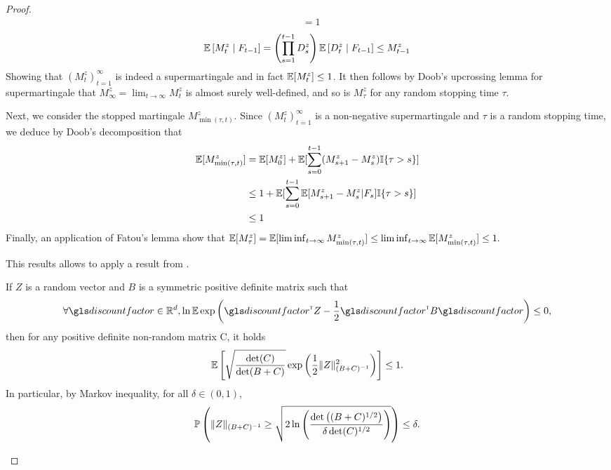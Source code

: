 \begin{subappendices}
\begin{proof}
\begin{align*}
		&= 1
		\end{align*}
		\begin{align*}
		\operatorname*{\mathbb{E}}\left[M_t^z \;\middle|\; F_{t-1}\right] = \left(\prod_{s=1}^{t-1} D_s^z\right) \operatorname*{\mathbb{E}}\left[D_t^z \;\middle|\; F_{t-1}\right] \leq M_{t-1}^z
		\end{align*}
		Showing that $(M_t^z)_{t=1}^\infty$ is indeed a supermartingale and in fact $\operatorname*{\mathbb{E}}[M_t^z]\leq 1$.
		It then follows by Doob's upcrossing lemma for supermartingale that $M_\infty^z = \lim_{t\to\infty} M_t^z$ is almost surely well-defined, and so is $M_\tau^z$ for any random stopping time $\tau$.
		
		Next, we consider the stopped martingale $M_{\min(\tau,t)}^z$. Since 
		$(M_t^z)_{t=1}^\infty$ is a non-negative supermartingale and $\tau$ is a random stopping time, we deduce by Doob's decomposition that
		\begin{align*}
		\operatorname*{\mathbb{E}}[M_{\min(\tau,t)}^z] &= \operatorname*{\mathbb{E}}[M_0^z] + \operatorname*{\mathbb{E}}[\sum_{s=0}^{t-1} (M_{s+1}^z-M_s^z) \mathbb{I}\{\tau>s\}]\\
		&\leq 1 + \operatorname*{\mathbb{E}}[\sum_{s=0}^{t-1} \operatorname*{\mathbb{E}}[M_{s+1}^z-M_s^z|F_{s}] \mathbb{I}\{\tau>s\}]\\
		&\leq 1
		\end{align*}
		Finally, an application of Fatou's lemma show that 
		$\operatorname*{\mathbb{E}}[M_\tau^z] = \operatorname*{\mathbb{E}}[\liminf_{t\to\infty} M_{\min(\tau,t)}^z] \leq \liminf_{t\to\infty} \operatorname*{\mathbb{E}}[M_{\min(\tau,t)}^z] \leq 1.$
		
		This results allows to apply a result from \citep{pena2008self}.
		\begin{lemma}
			\begin{leftbar}[lemmabar]
			If $Z$ is a random vector and $B$ is a symmetric positive definite matrix such that
			\[\forall \discount\in\Real^d, \ln \expectedvalue \exp \left(\discount^\transp Z -\frac{1}{2} \discount^\transp B \discount \right)\leq 0,\]
			then for any positive definite non-random matrix C, it holds
			\[\operatorname*{\mathbb{E}}\left[ \sqrt{\frac{\det(C)}{\det(B+C)} } \exp\left( \frac{1}{2}\|Z\|^2_{(B+C)^{-1}}\right)\right]\leq 1. \] 
			In particular, by Markov inequality, for all $\delta\in(0,1)$, 
			\[\mathbb{P}\left(\|Z\|_{(B+C)^{-1}} \geq \sqrt{2\ln \left(\frac{\det \left((B+C)^{1/2}\right)}{\delta\det(C)^{1/2}}\right)}\right)\leq \delta.\]
			\end{leftbar}
		\end{lemma}
		

\end{proof}
\end{subappendices}
